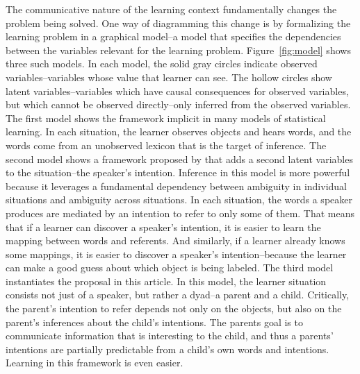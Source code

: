 \documentclass[review]{elsarticle}
\begin{document}
The communicative nature of the learning context fundamentally changes the problem being solved. One way of diagramming this change is by formalizing the learning problem in a graphical model--a model that specifies the dependencies between the variables relevant for the learning problem. Figure~\ref{fig:model} shows three such models. In each model, the solid gray circles indicate observed variables--variables whose value that learner can see. The hollow circles show latent variables--variables which have causal consequences for observed variables, but which cannot be observed directly--only inferred from the observed variables. The first model shows the framework implicit in many models of statistical learning. In each situation, the learner observes objects and hears words, and the words come from an unobserved lexicon that is the target of inference. The second model shows a framework proposed by \cite{frank2009} that adds a second latent variables to the situation--the speaker's intention. Inference in this model is more powerful because it leverages a fundamental dependency between ambiguity in individual situations and ambiguity across situations. In each situation, the words a speaker produces are mediated by an intention to refer to only some of them. That means that if a learner can discover a speaker's intention, it is easier to learn the mapping between words and referents. And similarly, if a learner already knows some mappings, it is easier to discover a speaker's intention--because the learner can make a good guess about which object is being labeled. The third model instantiates the proposal in this article. In this model, the learner situation consists not just of a speaker, but rather a dyad--a parent and a child. Critically, the parent's intention to refer depends not only on the objects, but also on the parent's inferences about the child's intentions. The parents goal is to communicate information that is interesting to the child, and thus a parents' intentions are partially predictable from a child's own words and intentions. Learning in this framework is even easier.
\end{document}
